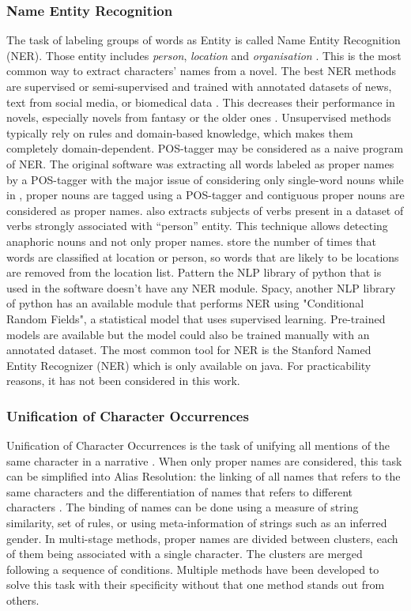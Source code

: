 \documentclass[a4paper, 12pt]{report}
\begin{document}
\subsubsection{Name Entity Recognition}
The task of labeling groups of words as Entity is called Name Entity Recognition (NER).
Those entity includes \textit{person}, \textit{location} and \textit{organisation} \citep{libraries}.
This is the most common way to extract characters' names from a novel.
The best NER methods are supervised or semi-supervised and trained with annotated datasets of news, text from social media, or biomedical data \citep{NER_survey_recent}.
This decreases their performance in novels, especially novels from fantasy or the older ones \citep{NER}.
Unsupervised methods typically rely on rules and domain-based knowledge, which makes them completely domain-dependent.
POS-tagger may be considered as a naive program of NER.
The original software \citep{original} was extracting all words labeled as proper names by a POS-tagger with the major issue of considering only single-word nouns
while in \cite{quoted}, proper nouns are tagged using a POS-tagger and contiguous proper nouns are considered as proper names.
\cite{character_meta} also extracts subjects of verbs present in a dataset of verbs strongly associated with ``person'' entity.
This technique allows detecting anaphoric nouns and not only proper names. \cite{ structure_clustering} store the number of times that words are classified at location or person,
so words that are likely to be locations are removed from the location list.
Pattern the NLP library of python that is used in the software doesn't have any NER module.
Spacy, another NLP library of python has an available module that performs NER using "Conditional Random Fields", a statistical model that uses supervised learning.
Pre-trained models are available but the model could also be trained manually with an annotated dataset.
The most common tool for NER is the Stanford Named Entity Recognizer (NER) which is only available on java. For practicability reasons, it has not been considered in this work.\\


\subsubsection{Unification of Character Occurrences}
Unification of Character Occurrences is the task of unifying all mentions of the same character in a narrative \citep{fiction}.
When only proper names are considered, this task can be simplified into Alias Resolution:
the linking of all names that refers to the same characters and the differentiation of names that refers to different characters \citep{book_social}.
The binding of names can be done using a measure of string similarity, set of rules, or using meta-information of strings such as an inferred gender.
In multi-stage methods, proper names are divided between clusters, each of them being associated with a single character. The clusters are merged following a sequence of conditions.
Multiple methods have been developed to solve this task with their specificity without that one method stands out from others.\\
\end{document}
